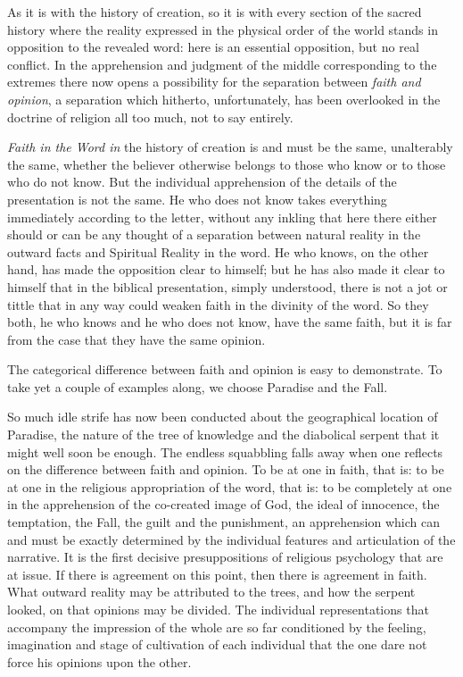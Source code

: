\documentclass[12pt,a4paper,openany]{book}
\newcommand{\opage}[1]{\marginnote{\footnotesize\textit{[#1]}}}
\begin{document}
As it is with the history of creation, so
it is with every section of the sacred
\setcounter{footnote}{0}%
\opage{30}history where the reality expressed in the physical order of the world
stands in opposition to the revealed word:
here is an essential opposition, but no real conflict.
In the apprehension and judgment of the middle corresponding to the extremes
there now opens a possibility for the separation
between \emph{faith and opinion}, a separation which hitherto,
unfortunately, has been overlooked in the doctrine of religion all too much, not to say entirely.

\emph{Faith in the Word in} the history of creation is and must
be the same, unalterably the same, whether the
believer otherwise belongs to those who know or to those who do not know.
But the individual apprehension of the details of the presentation
is not the same. He who does not know takes
everything immediately according to the letter, without any inkling that here
there either should or can be any thought of a separation between
natural reality in the outward facts and Spiritual Reality
in the word. He who knows, on the other hand, has made
the opposition clear to himself; but he has also made it
clear to himself that in the biblical presentation, simply understood,
there is not a jot or tittle that in any way
could weaken faith in the divinity of the word. So
they both, he who knows and he who does not know,
have the same faith, but it is far from the case that they have the same
opinion.

The categorical difference between faith and opinion is
easy to demonstrate. To take yet a couple of examples
along, we choose Paradise and the Fall.

So much idle strife has now been conducted about the
geographical location of Paradise, the nature of
the tree of knowledge and the diabolical serpent
that it might well soon be enough. The endless squabbling falls away
\setcounter{footnote}{0}%
\opage{31}when one reflects on the difference between faith
and opinion. To be at one in faith, that is: to be
at one in the religious appropriation of the word, that is: to be
completely at one in the apprehension of the co-created image of God,
the ideal of innocence, the temptation, the Fall, the guilt and
the punishment, an apprehension which can and must be exactly determined
by the individual features and articulation of the narrative. It
is the first decisive presuppositions of religious psychology
that are at issue. If there is agreement on this
point, then there is agreement in faith. What outward reality
may be attributed to the trees, and how the serpent
looked, on that opinions may be divided. The
individual representations that accompany the impression of the
whole are so far conditioned by the feeling,
imagination and stage of cultivation of each individual that the one dare not
force his opinions upon the other.
\end{document}
